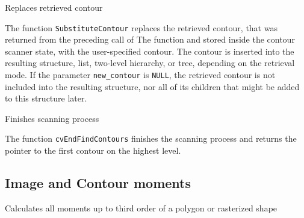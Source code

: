 Replaces retrieved contour


\begin{description}
\end{description}

The function \texttt{SubstituteContour} replaces the retrieved
contour, that was returned from the preceding call of The function
 and stored inside the contour scanner
state, with the user-specified contour. The contour is inserted
into the resulting structure, list, two-level hierarchy, or tree,
depending on the retrieval mode. If the parameter \texttt{new\_contour}
is \texttt{NULL}, the retrieved contour is not included into the
resulting structure, nor all of its children that might be added
to this structure later.

\label{EndFindContours}

Finishes scanning process


\begin{description}
\end{description}

The function \texttt{cvEndFindContours} finishes the scanning process and returns the pointer to the first contour on the highest level.


\subsection{Image and Contour moments}

\label{Moments}

Calculates all moments up to third order of a polygon or rasterized shape


